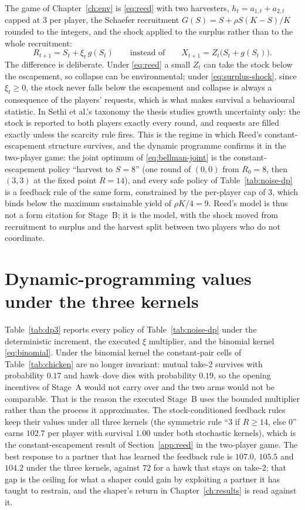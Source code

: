 The game of Chapter~\ref{ch:env} is \eqref{eq:reed} with two harvesters,
\(h_t=a_{1,t}+a_{2,t}\) capped at 3 per player, the Schaefer recruitment
\(G(S)=S+\rho S(K-S)/K\) rounded to the integers, and the shock applied to
the surplus rather than to the whole recruitment:
\begin{equation}
  R_{t+1}=S_t+\xi_t\,g(S_t)
  \qquad\text{instead of}\qquad
  X_{t+1}=Z_t\bigl(S_t+g(S_t)\bigr).
  \label{eq:surplus-shock}
\end{equation}
The difference is deliberate.
Under \eqref{eq:reed} a small \(Z_t\) can take the stock below the
escapement, so collapse can be environmental; under
\eqref{eq:surplus-shock}, since \(\xi_t\ge 0\), the stock never falls below
the escapement and collapse is always a consequence of the players'
requests, which is what makes survival a behavioural statistic.
In Sethi et al.'s taxonomy the thesis studies growth uncertainty only:
the stock is reported to both players exactly every round, and requests
are filled exactly unless the scarcity rule fires.
This is the regime in which Reed's constant-escapement structure survives,
and the dynamic programme confirms it in the two-player game: the joint
optimum of \eqref{eq:bellman-joint} is the constant-escapement policy
``harvest to \(S=8\)'' (one round of \((0,0)\) from \(R_0=8\), then
\((3,3)\) at the fixed point \(R=14\)), and every safe policy of
Table~\ref{tab:noise-dp} is a feedback rule of the same form, constrained
by the per-player cap of 3, which binds below the maximum sustainable
yield of \(\rho K/4=9\).
Reed's model is thus not a form citation for Stage~B; it is the model, with
the shock moved from recruitment to surplus and the harvest split between
two players who do not coordinate.

\section{Dynamic-programming values under the three kernels}
\label{app:dp3}

Table~\ref{tab:dp3} reports every policy of Table~\ref{tab:noise-dp}
under the deterministic increment, the executed \(\xi\) multiplier, and
the binomial kernel \eqref{eq:binomial}.
Under the binomial kernel the constant-pair cells of Table~\ref{tab:chicken}
are no longer invariant: mutual take-2 survives with probability
\(0.17\) and hawk--dove dies with probability \(0.19\), so the opening
incentives of Stage~A would not carry over and the two arms would not be
comparable.
That is the reason the executed Stage~B uses the bounded multiplier
rather than the process it approximates.
The stock-conditioned feedback rules keep their values under all three
kernels (the symmetric rule ``3 if \(R\ge 14\), else 0'' earns
\(102.7\) per player with survival \(1.00\) under both stochastic kernels),
which is the constant-escapement result of Section~\ref{app:reed} in the
two-player game.
The best response to a partner that has learned the feedback rule is
\(107.0\), \(105.5\) and \(104.2\) under the three kernels, against
\(72\) for a hawk that stays on take-2; that gap is the ceiling for what a
shaper could gain by exploiting a partner it has taught to restrain, and
the shaper's return in Chapter~\ref{ch:results} is read against it.

